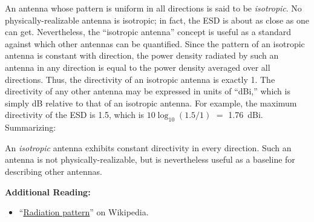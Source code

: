 An antenna whose pattern is uniform in all directions is said to be \emph{isotropic}.
No physically-realizable antenna is isotropic; in fact, the ESD is about as close as one can get.
Nevertheless, the ``isotropic antenna'' concept is useful as a standard against which other antennas can be quantified.
Since the pattern of an isotropic antenna is constant with direction, the power density radiated by such an antenna in any direction is equal to the power density averaged over all directions.  Thus, the directivity of an isotropic antenna is exactly 1.  The directivity of any other antenna may be expressed in units of ``dBi,'' which is simply dB relative to that of an isotropic antenna.  For example, the maximum directivity of the ESD is 1.5, which is $10\log_{10}\left(1.5/1\right)$ $=$ 1.76~dBi.
Summarizing:
%
\begin{mdframed}[backgroundcolor=yellow!20,nobreak=true] 
An \emph{isotropic} antenna exhibits constant directivity in every direction.
Such an antenna is not physically-realizable, but is nevertheless useful as a baseline for describing other antennas.
\end{mdframed}


{\bf Additional Reading:}
\begin{itemize}
\item ``\href{https://en.wikipedia.org/wiki/Radiation_pattern}{Radiation pattern}''  on Wikipedia.
\end{itemize}



